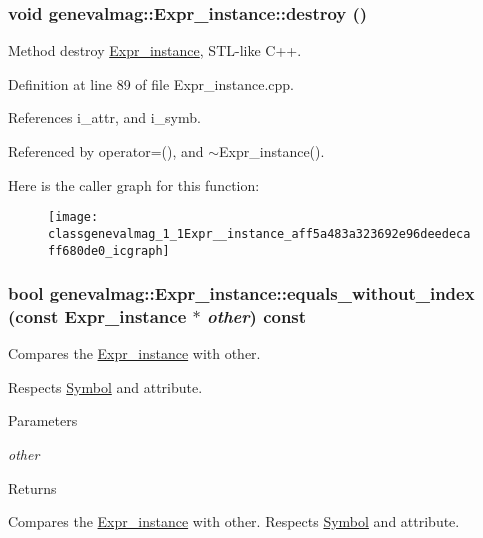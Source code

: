 \hypertarget{classgenevalmag_1_1Expr__instance_aff5a483a323692e96deedecaff680de0}{
\subsubsection[{destroy}]{\setlength{\rightskip}{0pt plus 5cm}void genevalmag::Expr\_\-instance::destroy ()}}
\label{classgenevalmag_1_1Expr__instance_aff5a483a323692e96deedecaff680de0}
Method destroy \hyperlink{classgenevalmag_1_1Expr__instance}{Expr\_\-instance}, STL-\/like C++. 

Definition at line 89 of file Expr\_\-instance.cpp.



References i\_\-attr, and i\_\-symb.



Referenced by operator=(), and $\sim$Expr\_\-instance().



Here is the caller graph for this function:\nopagebreak
\begin{figure}[H]
\begin{center}
\leavevmode
\texttt{[image: classgenevalmag\_1\_1Expr\_\_instance\_aff5a483a323692e96deedecaff680de0\_icgraph]}
\end{center}
\end{figure}


\hypertarget{classgenevalmag_1_1Expr__instance_afc3206f63c77c3fc8bbfdf4d2ef7de2e}{
\subsubsection[{equals\_\-without\_\-index}]{\setlength{\rightskip}{0pt plus 5cm}bool genevalmag::Expr\_\-instance::equals\_\-without\_\-index (const {\bf Expr\_\-instance} $\ast$ {\em other}) const}}
\label{classgenevalmag_1_1Expr__instance_afc3206f63c77c3fc8bbfdf4d2ef7de2e}
Compares the \hyperlink{classgenevalmag_1_1Expr__instance}{Expr\_\-instance} with other.\par
 Respects \hyperlink{classgenevalmag_1_1Symbol}{Symbol} and attribute. 
\begin{DoxyParams}{Parameters}
\item[{\em other}]\end{DoxyParams}
\begin{DoxyReturn}{Returns}

\end{DoxyReturn}
Compares the \hyperlink{classgenevalmag_1_1Expr__instance}{Expr\_\-instance} with other. Respects \hyperlink{classgenevalmag_1_1Symbol}{Symbol} and attribute. 

